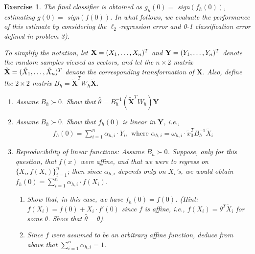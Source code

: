 \documentclass[12pt]{article}
\theoremstyle{colon}
\newtheorem{exercise}{Exercise}
\begin{document}
\begin{exercise}
  The final classifier is obtained as $g_h(0) =$ sign$(f_h(0))$, estimating $g(0) =$ sign$(f(0))$. In what follows, we evaluate the performance of this estimate by considering the $\ell_2$-regression error and 0-1 classification error defined in problem 3).

  To simplify the notation, let $\textbf{X} = (X_1, \mathellipsis, X_n)^T$ and $\textbf{Y} = (Y_1, \mathellipsis, Y_n)^T$ denote the random samples viewed as vectors, and let the $n \times 2$ matrix $\tilde{\textbf{X}} = (\tilde{X}_1, \mathellipsis, \tilde{X}_n)^T$ denote the corresponding transformation of $\textbf{X}$. Also, define the $2 \times 2$ matrix $B_h = \tilde{\textbf{X}}^T W_h \tilde{\textbf{X}}$.

  \begin{enumerate}[label=\arabic*)]
    \item Assume $B_h \succ 0$. Show that $\widehat{\theta} = B_h^{-1} (\tilde{\textbf{X}}^T W_h)\textbf{Y}$
    \item Assume $B_h \succ 0$. Show that $f_h(0)$ is linear in $\textbf{Y}$, i.e.,
      \begin{gather*}
        f_h(0) = \sum_{i=1}^n \alpha_{h,i} \cdot Y_i, \text{ where } \alpha_{h,i} = \omega_{h,i} \cdot \tilde{x}_0^T B_h^{-1} \tilde{X}_i
      \end{gather*}
    \item Reproducibility of linear functions:
      Assume $B_h \succ 0$. Suppose, only for this question, that $f(x)$ were affine, and that we were to regress on $\{ X_i, f(X_i) \}_{i=1}^n$; then since $\alpha_{h,i}$ depends only on $X_i$'s, we would obtain $f_h(0) = \sum_{i=1}^n \alpha_{h,i} \cdot f(X_i)$.
      \begin{enumerate}[label=\alph*)]
        \item Show that, in this case, we have $f_h(0) = f(0)$.
          (Hint: $f(X_i) = f(0) + X_i \cdot f'(0)$ since $f$ is affine, i.e., $f(X_i) = \theta^T \tilde{X}_i$ for some $\theta$. Show that $\widehat{\theta} = \theta$).
        \item Since $f$ were assumed to be an arbitrary affine function, deduce from above that $\sum_{i=1}^n \alpha_{h,i} = 1$.
      \end{enumerate}


\end{enumerate}
\end{exercise}
\end{document}
